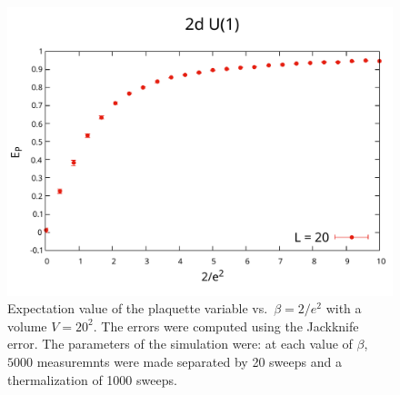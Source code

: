 \documentclass[12pt,a4paper]{article}
\begin{document}
	\begin{figure}
		\centering
		\includegraphics[scale=0.6]{n_term=1000-nmeas=5000-nskip=20.pdf}
		\caption{Expectation value of the plaquette variable vs.\ $\beta = 2/e^2$ with a volume $V = 20^2$. The errors were computed using the Jackknife error. The parameters of the simulation were: at each value of $\beta$, $5000$ measuremnts were made separated by 20 sweeps and a thermalization of 1000 sweeps.}
	\end{figure}
\end{document}
